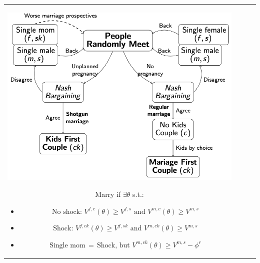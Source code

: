 \documentclass[landscape,a0paper,fontscale=0.285]{baposter} %
\begin{document}
\begin{poster}
{\begin{tabular}{c c c c}
\begin{minipage}{0.27\linewidth}
\begin{center}
\includegraphics[scale=0.35]{scheme.png}
\end{center}
\vspace{-2em}
{\scriptsize \hspace{0.4cm} Marry if $\exists \theta$ s.t.:\vspace{-0.25em}
\begin{itemize}
\item { $\scriptstyle \text{No shock: } V^{f,c}(\theta) \geq V^{f,s} \text{ and } V^{m,c}(\theta) \geq V^{m,s}$}\vspace{-0.4em}
\item { $\scriptstyle \text{Shock: } V^{f,ck}(\theta) \geq V^{f,sk} \text{ and } V^{m,ck}(\theta) \geq V^{m,s}$}\vspace{-0.4em}
\item {$\scriptstyle \text{Single mom} \, = \, \text{Shock, but } V^{m,ck}(\theta) \geq V^{m,s} - \phi^r$}
\end{itemize}
}
\end{minipage}


\end{tabular}}
\end{poster}
\end{document}

